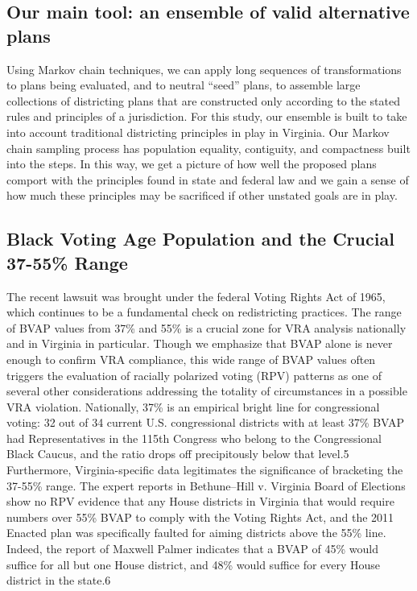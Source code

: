 \documentclass{mgggarticle}
\begin{document}
\subsection{Our main tool: an ensemble of valid alternative plans}

Using Markov chain techniques, we can apply long sequences of transformations to plans being
evaluated, and to neutral “seed” plans, to assemble large collections of districting plans that are
constructed only according to the stated rules and principles of a jurisdiction. For this study, our
ensemble is built to take into account traditional districting principles in play in Virginia. Our
Markov chain sampling process has population equality, contiguity, and compactness built into the
steps. In this way, we get a picture of how well the proposed plans comport with the principles
found in state and federal law and we gain a sense of how much these principles may be sacrificed
if other unstated goals are in play.

\subsection{Black Voting Age Population and the Crucial 37-55\% Range}

The recent lawsuit was brought under the federal Voting Rights Act of 1965, which continues to
be a fundamental check on redistricting practices. The range of BVAP values from 37\% and 55\%
is a crucial zone for VRA analysis nationally and in Virginia in particular. Though we emphasize
that BVAP alone is never enough to confirm VRA compliance, this wide range of BVAP values
often triggers the evaluation of racially polarized voting (RPV) patterns as one of several other
considerations addressing the totality of circumstances in a possible VRA violation. Nationally, 37\%
is an empirical bright line for congressional voting: 32 out of 34 current U.S. congressional districts
with at least 37\% BVAP had Representatives in the 115th Congress who belong to the Congressional
Black Caucus, and the ratio drops off precipitously below that level.5 Furthermore, Virginia-specific
data legitimates the significance of bracketing the 37-55\% range. The expert reports in Bethune–Hill
v. Virginia Board of Elections show no RPV evidence that any House districts in Virginia that would
require numbers over 55\% BVAP to comply with the Voting Rights Act, and the 2011 Enacted plan
was specifically faulted for aiming districts above the 55\% line. Indeed, the report of Maxwell
Palmer indicates that a BVAP of 45\% would suffice for all but one House district, and 48\% would
suffice for every House district in the state.6
\end{document}
